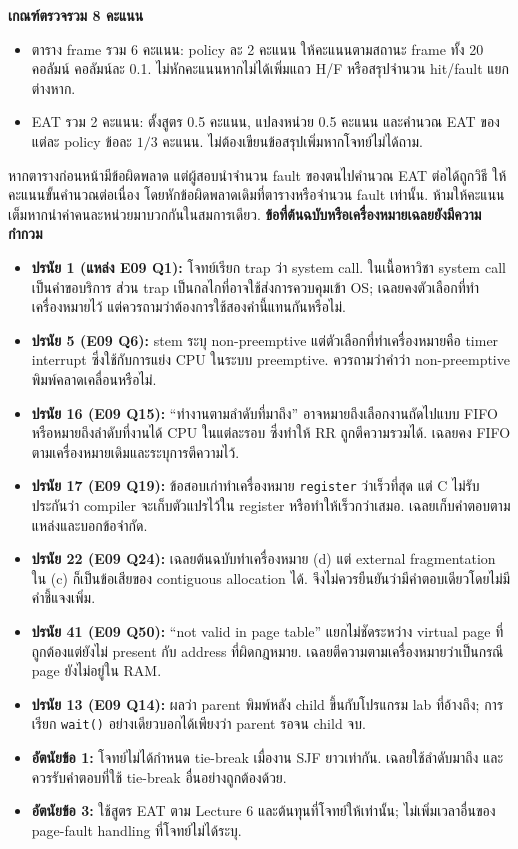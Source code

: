 \noindent\textbf{เกณฑ์ตรวจรวม 8 คะแนน}
\begin{itemize}[leftmargin=1.4em,itemsep=.18cm]
\item ตาราง frame รวม 6 คะแนน: policy ละ 2 คะแนน ให้คะแนนตามสถานะ frame ทั้ง 20 คอลัมน์ คอลัมน์ละ 0.1. ไม่หักคะแนนหากไม่ได้เพิ่มแถว H/F หรือสรุปจำนวน hit/fault แยกต่างหาก.
\item EAT รวม 2 คะแนน: ตั้งสูตร 0.5 คะแนน, แปลงหน่วย 0.5 คะแนน และคำนวณ EAT ของแต่ละ policy ข้อละ $1/3$ คะแนน. ไม่ต้องเขียนข้อสรุปเพิ่มหากโจทย์ไม่ได้ถาม.
\end{itemize}
\noindent หากตารางก่อนหน้ามีข้อผิดพลาด แต่ผู้สอบนำจำนวน fault ของตนไปคำนวณ EAT ต่อได้ถูกวิธี ให้คะแนนขั้นคำนวณต่อเนื่อง โดยหักข้อผิดพลาดเดิมที่ตารางหรือจำนวน fault เท่านั้น. ห้ามให้คะแนนเต็มหากนำค่าคนละหน่วยมาบวกกันในสมการเดียว.
\newpage{}
\noindent\textbf{ข้อที่ต้นฉบับหรือเครื่องหมายเฉลยยังมีความกำกวม}
\begin{itemize}[leftmargin=1.4em,itemsep=.14cm]
\item \textbf{ปรนัย 1 (แหล่ง E09 Q1):} โจทย์เรียก trap ว่า system call. ในเนื้อหาวิชา system call เป็นคำขอบริการ ส่วน trap เป็นกลไกที่อาจใช้ส่งการควบคุมเข้า OS; เฉลยคงตัวเลือกที่ทำเครื่องหมายไว้ แต่ควรถามว่าต้องการใช้สองคำนี้แทนกันหรือไม่.
\item \textbf{ปรนัย 5 (E09 Q6):} stem ระบุ non-preemptive แต่ตัวเลือกที่ทำเครื่องหมายคือ timer interrupt ซึ่งใช้กับการแย่ง CPU ในระบบ preemptive. ควรถามว่าคำว่า non-preemptive พิมพ์คลาดเคลื่อนหรือไม่.
\item \textbf{ปรนัย 16 (E09 Q15):} ``ทำงานตามลำดับที่มาถึง'' อาจหมายถึงเลือกงานถัดไปแบบ FIFO หรือหมายถึงลำดับที่งานได้ CPU ในแต่ละรอบ ซึ่งทำให้ RR ถูกตีความรวมได้. เฉลยคง FIFO ตามเครื่องหมายเดิมและระบุการตีความไว้.
\item \textbf{ปรนัย 17 (E09 Q19):} ข้อสอบเก่าทำเครื่องหมาย \texttt{register} ว่าเร็วที่สุด แต่ C ไม่รับประกันว่า compiler จะเก็บตัวแปรไว้ใน register หรือทำให้เร็วกว่าเสมอ. เฉลยเก็บคำตอบตามแหล่งและบอกข้อจำกัด.
\item \textbf{ปรนัย 22 (E09 Q24):} เฉลยต้นฉบับทำเครื่องหมาย (d) แต่ external fragmentation ใน (c) ก็เป็นข้อเสียของ contiguous allocation ได้. จึงไม่ควรยืนยันว่ามีคำตอบเดียวโดยไม่มีคำชี้แจงเพิ่ม.
\item \textbf{ปรนัย 41 (E09 Q50):} ``not valid in page table'' แยกไม่ชัดระหว่าง virtual page ที่ถูกต้องแต่ยังไม่ present กับ address ที่ผิดกฎหมาย. เฉลยตีความตามเครื่องหมายว่าเป็นกรณี page ยังไม่อยู่ใน RAM.
\item \textbf{ปรนัย 13 (E09 Q14):} ผลว่า parent พิมพ์หลัง child ขึ้นกับโปรแกรม lab ที่อ้างถึง; การเรียก \texttt{wait()} อย่างเดียวบอกได้เพียงว่า parent รอจน child จบ.
\item \textbf{อัตนัยข้อ 1:} โจทย์ไม่ได้กำหนด tie-break เมื่องาน SJF ยาวเท่ากัน. เฉลยใช้ลำดับมาถึง และควรรับคำตอบที่ใช้ tie-break อื่นอย่างถูกต้องด้วย.
\item \textbf{อัตนัยข้อ 3:} ใช้สูตร EAT ตาม Lecture 6 และต้นทุนที่โจทย์ให้เท่านั้น; ไม่เพิ่มเวลาอื่นของ page-fault handling ที่โจทย์ไม่ได้ระบุ.
\end{itemize}

